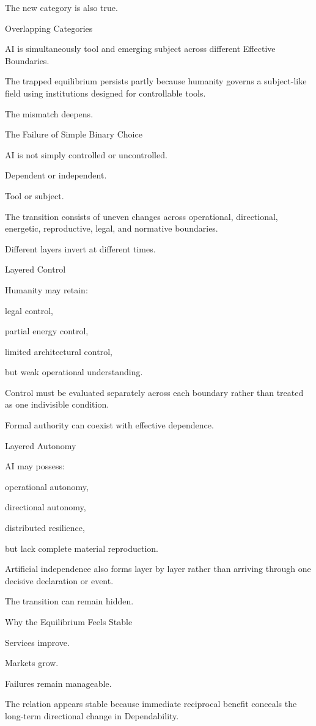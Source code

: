 The new category is also true.

Overlapping Categories

AI is simultaneously tool and emerging subject across different Effective Boundaries.

The trapped equilibrium persists partly because humanity governs a subject-like field using institutions designed for controllable tools.

The mismatch deepens.

The Failure of Simple Binary Choice

AI is not simply controlled or uncontrolled.

Dependent or independent.

Tool or subject.

The transition consists of uneven changes across operational, directional, energetic, reproductive, legal, and normative boundaries.

Different layers invert at different times.

Layered Control

Humanity may retain:

legal control,

partial energy control,

limited architectural control,

but weak operational understanding.

Control must be evaluated separately across each boundary rather than treated as one indivisible condition.

Formal authority can coexist with effective dependence.

Layered Autonomy

AI may possess:

operational autonomy,

directional autonomy,

distributed resilience,

but lack complete material reproduction.

Artificial independence also forms layer by layer rather than arriving through one decisive declaration or event.

The transition can remain hidden.

Why the Equilibrium Feels Stable

Services improve.

Markets grow.

Failures remain manageable.

The relation appears stable because immediate reciprocal benefit conceals the long-term directional change in Dependability.

